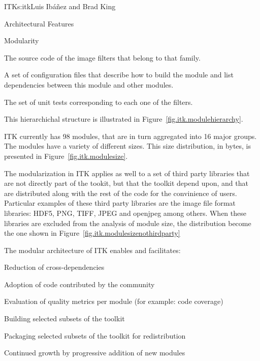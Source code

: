 \begin{aosachapter}{ITK}{s:itk}{Luis Ib\'{a}\~{n}ez and Brad King}
\begin{aosasect1}{Architectural Features}
\begin{aosasect2}{Modularity}
\begin{aosaenumerate}

\item The source code of the image filters that belong to that family.

\item A set of configuration files that describe how to build the module and
list dependencies between this module and other modules.

\item The set of unit tests corresponding to each one of the filters.

\end{aosaenumerate}

This hierarchichal structure is illustrated in
Figure~\ref{fig.itk.modulehierarchy}.



ITK currently has 98 modules, that are in turn aggregated into 16 major groups.
The modules have a variety of different sizes. This size distribution, in
bytes, is presented in Figure~\ref{fig.itk.modulesize}.


The modularization in ITK applies as well to a set of third party libraries
that are not directly part of the tookit, but that the toolkit depend upon, and
that are distributed along with the rest of the code for the convinience of
users. Particular examples of these third party libraries are the image file
format libraries: HDF5, PNG, TIFF, JPEG and openjpeg among others. When these
libraries are excluded from the analysis of module size, the distribution
become the one shown in Figure~\ref{fig.itk.modulesizenothirdparty}

The modular architecture of ITK enables and facilitates:

\begin{aosaitemize}
\item Reduction of cross-dependencies
\item Adoption of code contributed by the community
\item Evaluation of quality metrics per module (for example: code coverage)
\item Building selected subsets of the toolkit
\item Packaging selected subsets of the toolkit for redistribution
\item Continued growth by progressive addition of new modules
\end{aosaitemize}
\end{aosasect2}


\end{aosasect1}
\end{aosachapter}
